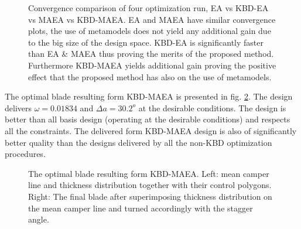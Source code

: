 \begin{figure}[h!]
\begin{minipage}[b]{1\linewidth}
 \centering
\end{minipage}
\caption{Convergence comparison of four optimization run, EA vs KBD-EA vs MAEA vs KBD-MAEA. EA and MAEA have similar convergence plots, the use of metamodels does not yield any additional gain due to the big size of the design space. KBD-EA is significantly faster than EA \& MAEA thus proving the merits of the proposed method. Furthermore KBD-MAEA yields additional gain proving the positive effect that the proposed method has also on the use of metamodels.} 
\label{CBRDrela}
\end{figure}

The optimal blade resulting form KBD-MAEA is presented in fig. \ref{CBRDrelaRes}. The design delivers $\omega=0.01834$ and $\Delta a = 30.2^o$ at the desirable conditions. The design is better than all basis design (operating at the desirable conditions) and respects all the constraints. The delivered form KBD-MAEA design is also of significantly better quality than the designs delivered by all the non-KBD optimization procedures. 

\begin{figure}[h!]
\begin{minipage}[b]{1\linewidth}
 \centering
\end{minipage}
\caption{The optimal blade resulting form KBD-MAEA. Left: mean camper line and thickness distribution together with their control polygons. Right: The final blade after superimposing thickness distribution on the mean camper line and turned accordingly with the stagger angle.} 
\label{CBRDrelaRes}
\end{figure}



